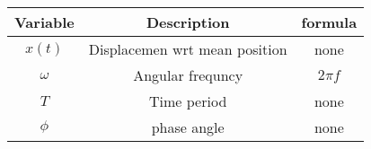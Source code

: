   \begin{tabular}{|c|c|c|} 
      \hline
\textbf{Variable}& \textbf{Description}& formula\\\hline
         $x(t)$&  Displacemen wrt mean position&none\\\hline
          $\omega$&Angular frequncy&$2\pi f$\\\hline
          $T$& Time period &none \\ \hline
          $\phi$& phase angle &none \\ \hline
    \end{tabular}
